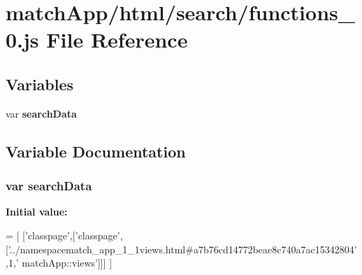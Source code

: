 \section{match\+App/html/search/functions\+\_\+0.js File Reference}
\label{functions__0_8js}
\subsection*{Variables}
\begin{DoxyCompactItemize}
\item 
var {\bf search\+Data}
\end{DoxyCompactItemize}


\subsection{Variable Documentation}
\subsubsection[{search\+Data}]{\setlength{\rightskip}{0pt plus 5cm}var search\+Data}\label{functions__0_8js_ad01a7523f103d6242ef9b0451861231e}
{\bfseries Initial value\+:}
\begin{DoxyCode}
=
[
  [\textcolor{stringliteral}{'classpage'},[\textcolor{stringliteral}{'classpage'},[\textcolor{stringliteral}{'../namespacematch\_app\_1\_1views.html#a7b76cd14772beae8c740a7ac15342804'},1,\textcolor{stringliteral}{'
      matchApp::views'}]]]
]
\end{DoxyCode}

